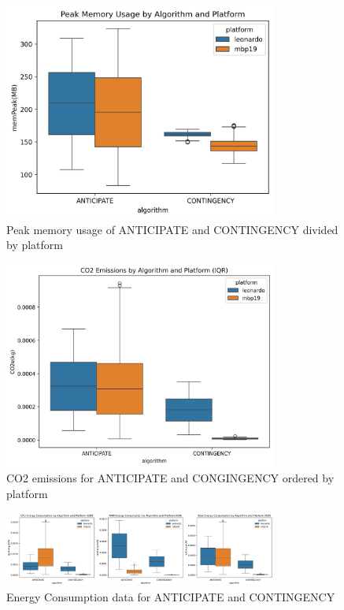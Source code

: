 \documentclass[a4paper,singleside,12pt]{report} %
\begin{document}
\begin{figure}[h!]
    \centering
    \includegraphics[width=0.8\textwidth]{imgs/peak_mem_usage.png}
    \caption{Peak memory usage of ANTICIPATE and CONTINGENCY divided by platform}
    \label{fig:ant_cont_peak_mem_usage}
\end{figure}

\begin{figure}[h!]
    \centering
    \includegraphics[width=0.8\textwidth]{imgs/CO2_emissions_no_outliers.png}
    \caption{CO2 emissions for ANTICIPATE and CONGINGENCY ordered by platform}
    \label{fig:ant_cont_co2_emissions}
\end{figure}

\begin{figure}[h!]
    \centering
    \includegraphics[width=0.8\textwidth]{imgs/energy_consumption_no_outliers.png}
    \caption{Energy Consumption data for ANTICIPATE and CONTINGENCY}
    \label{fig:ant_cont_energy}
\end{figure}
\end{document}
